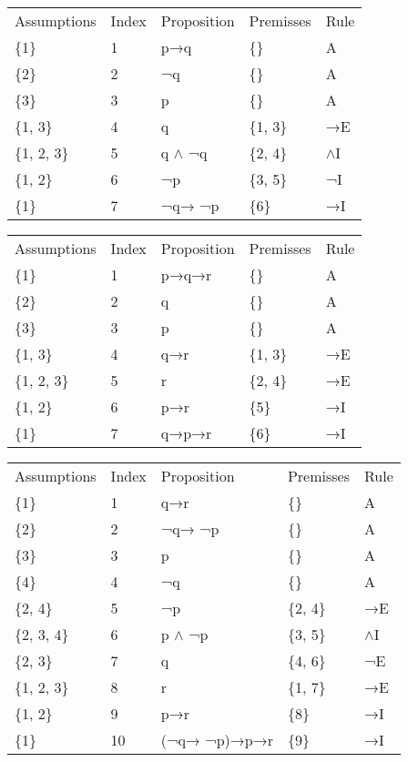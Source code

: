 \documentclass[a4paper,12pt]{book}
\begin{document}
\begin{tabular}{lllll}
\toprule
Assumptions & Index & Proposition & Premisses & Rule \\
        \{1\} &     1 &         p→q &        \{\} &    A \\
\midrule
        \{2\} &     2 &          ¬q &        \{\} &    A \\
        \{3\} &     3 &           p &        \{\} &    A \\
     \{1, 3\} &     4 &           q &    \{1, 3\} &   →E \\
  \{1, 2, 3\} &     5 &       q $\wedge$ ¬q &    \{2, 4\} &   $\wedge$I \\
     \{1, 2\} &     6 &          ¬p &    \{3, 5\} &   ¬I \\
        \{1\} &     7 &      ¬q→ ¬p &       \{6\} &   →I \\
\bottomrule
\end{tabular}
\begin{tabular}{lllll}
\toprule
Assumptions & Index & Proposition & Premisses & Rule \\
        \{1\} &     1 &       p→q→r &        \{\} &    A \\
\midrule
        \{2\} &     2 &           q &        \{\} &    A \\
        \{3\} &     3 &           p &        \{\} &    A \\
     \{1, 3\} &     4 &         q→r &    \{1, 3\} &   →E \\
  \{1, 2, 3\} &     5 &           r &    \{2, 4\} &   →E \\
     \{1, 2\} &     6 &         p→r &       \{5\} &   →I \\
        \{1\} &     7 &       q→p→r &       \{6\} &   →I \\
\bottomrule
\end{tabular}
\begin{tabular}{lllll}
\toprule
Assumptions & Index &  Proposition & Premisses & Rule \\
        \{1\} &     1 &          q→r &        \{\} &    A \\
\midrule
        \{2\} &     2 &       ¬q→ ¬p &        \{\} &    A \\
        \{3\} &     3 &            p &        \{\} &    A \\
        \{4\} &     4 &           ¬q &        \{\} &    A \\
     \{2, 4\} &     5 &           ¬p &    \{2, 4\} &   →E \\
  \{2, 3, 4\} &     6 &        p $\wedge$ ¬p &    \{3, 5\} &   $\wedge$I \\
     \{2, 3\} &     7 &            q &    \{4, 6\} &   ¬E \\
  \{1, 2, 3\} &     8 &            r &    \{1, 7\} &   →E \\
     \{1, 2\} &     9 &          p→r &       \{8\} &   →I \\
        \{1\} &    10 & (¬q→ ¬p)→p→r &       \{9\} &   →I \\
\bottomrule
\end{tabular}
\end{document}
